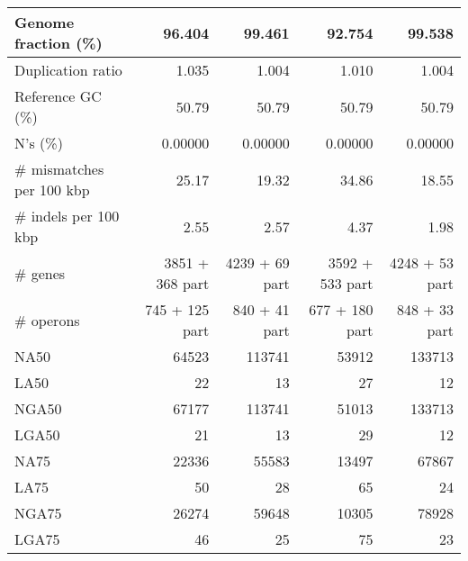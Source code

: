 \begin{table}[ht]
\begin{center}
\begin{tabular}{|l*{4}{|r}|}
Genome fraction (\%) & 96.404 & 99.461 & 92.754 & 99.538 \\ \hline
Duplication ratio & 1.035 & 1.004 & 1.010 & 1.004 \\ \hline
Reference GC (\%) & 50.79 & 50.79 & 50.79 & 50.79 \\ \hline
N's (\%) & 0.00000 & 0.00000 & 0.00000 & 0.00000 \\ \hline
\# mismatches per 100 kbp & 25.17 & 19.32 & 34.86 & 18.55 \\ \hline
\# indels per 100 kbp & 2.55 & 2.57 & 4.37 & 1.98 \\ \hline
\# genes & 3851 + 368 part & 4239 + 69 part & 3592 + 533 part & 4248 + 53 part \\ \hline
\# operons & 745 + 125 part & 840 + 41 part & 677 + 180 part & 848 + 33 part \\ \hline
NA50 & 64523 & 113741 & 53912 & 133713 \\ \hline
LA50 & 22 & 13 & 27 & 12 \\ \hline
NGA50 & 67177 & 113741 & 51013 & 133713 \\ \hline
LGA50 & 21 & 13 & 29 & 12 \\ \hline
NA75 & 22336 & 55583 & 13497 & 67867 \\ \hline
LA75 & 50 & 28 & 65 & 24 \\ \hline
NGA75 & 26274 & 59648 & 10305 & 78928 \\ \hline
LGA75 & 46 & 25 & 75 & 23 \\ \hline
\end{tabular}
\end{center}
\end{table}
